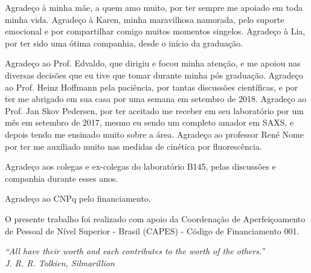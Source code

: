 \documentclass[
	12pt,				%
	openright,			%
	twoside,			%
	a4paper,			%
	english,			%
	brazil%
	]{abntex2}
\begin{document}
\begin{agradecimentos}

Agradeço à minha mãe, a quem amo muito, por ter sempre me apoiado em toda minha vida. Agradeço à Karen, minha maravilhosa namorada, pelo suporte emocional e por compartilhar comigo muitos momentos singelos. Agradeço à Lia, por ter sido uma ótima companhia, desde o início da graduação.

Agradeço ao Prof. Edvaldo, que dirigiu e focou minha atenção, e me apoiou nas diversas decisões que eu tive que tomar durante minha pós graduação. Agradeço ao Prof. Heinz Hoffmann pela paciência, por tantas discussões científicas, e por ter me abrigado em sua casa por uma semana em setembro de 2018. Agradeço ao Prof. Jan Skov Pedersen, por ter aceitado me receber em seu laboratório por um mês em setembro de 2017, mesmo eu sendo um completo amador em SAXS, e depois tendo me ensinado muito sobre a área. Agradeço ao professor René Nome por ter me auxiliado muito nas medidas de cinética por fluorescência.

Agradeço aos colegas e ex-colegas do laboratório B145, pelas discussões e companhia durante esses anos.

Agradeço ao CNPq pelo financiamento.

O presente trabalho foi realizado com apoio da Coordenação de Aperfeiçoamento de Pessoal de Nível Superior - Brasil (CAPES) - Código de Financiamento 001.

\end{agradecimentos}

\begin{epigrafe}
    \vspace*{\fill}
	\begin{flushright}
		\textit{``All have their worth and each contributes to the worth of the others.'' \\ J. R. R. Tolkien, Silmarillion}
	\end{flushright}
\end{epigrafe}

\end{document}
